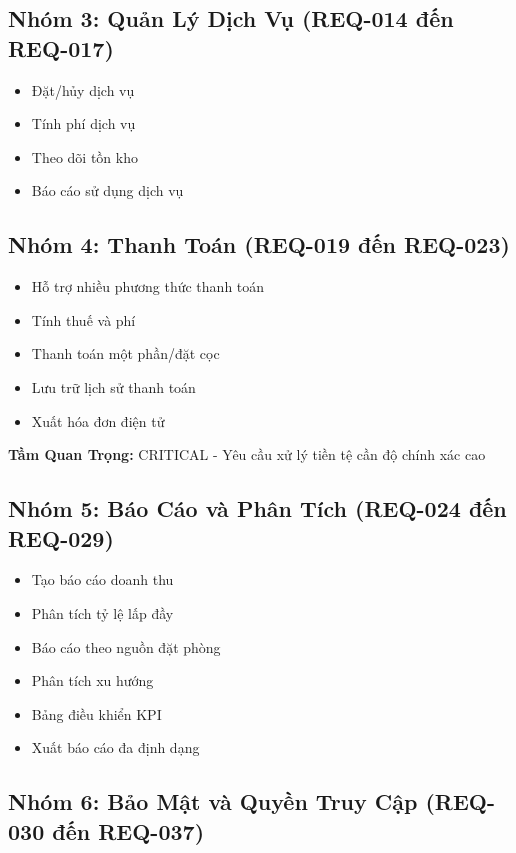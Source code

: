 \documentclass[12pt, a4paper]{article}
\begin{document}
\subsection{Nhóm 3: Quản Lý Dịch Vụ (REQ-014 đến REQ-017)}

\begin{itemize}
    \item Đặt/hủy dịch vụ
    \item Tính phí dịch vụ
    \item Theo dõi tồn kho
    \item Báo cáo sử dụng dịch vụ
\end{itemize}

\subsection{Nhóm 4: Thanh Toán (REQ-019 đến REQ-023)}

\begin{itemize}
    \item Hỗ trợ nhiều phương thức thanh toán
    \item Tính thuế và phí
    \item Thanh toán một phần/đặt cọc
    \item Lưu trữ lịch sử thanh toán
    \item Xuất hóa đơn điện tử
\end{itemize}

\textbf{Tầm Quan Trọng:} CRITICAL - Yêu cầu xử lý tiền tệ cần độ chính xác cao

\subsection{Nhóm 5: Báo Cáo và Phân Tích (REQ-024 đến REQ-029)}

\begin{itemize}
    \item Tạo báo cáo doanh thu
    \item Phân tích tỷ lệ lấp đầy
    \item Báo cáo theo nguồn đặt phòng
    \item Phân tích xu hướng
    \item Bảng điều khiển KPI
    \item Xuất báo cáo đa định dạng
\end{itemize}

\subsection{Nhóm 6: Bảo Mật và Quyền Truy Cập (REQ-030 đến REQ-037)}
\end{document}

